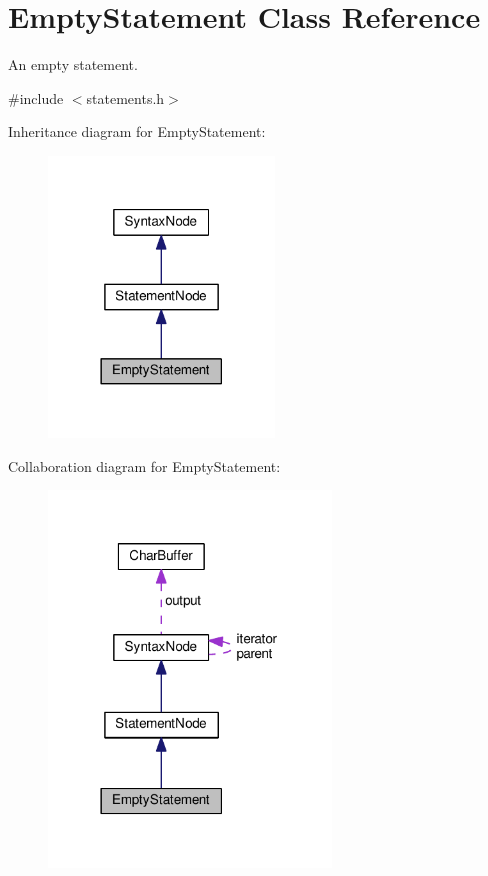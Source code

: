 \hypertarget{classEmptyStatement}{}\section{Empty\+Statement Class Reference}
\label{classEmptyStatement}


An empty statement.  




{\ttfamily \#include $<$statements.\+h$>$}



Inheritance diagram for Empty\+Statement\+:
\nopagebreak
\begin{figure}[H]
\begin{center}
\leavevmode
\includegraphics[width=170pt]{da/def/classEmptyStatement__inherit__graph}
\end{center}
\end{figure}


Collaboration diagram for Empty\+Statement\+:
\nopagebreak
\begin{figure}[H]
\begin{center}
\leavevmode
\includegraphics[width=213pt]{dc/d4a/classEmptyStatement__coll__graph}
\end{center}
\end{figure}
